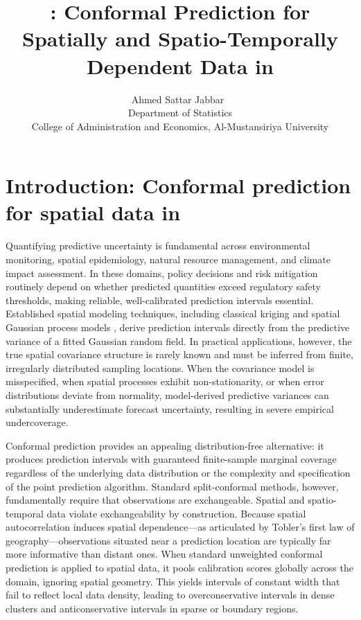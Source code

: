 \documentclass[article]{jss}
\author{Ahmed Sattar Jabbar~\orcidlink{0009-0006-4614-735X}\\Department of Statistics\\College of Administration and Economics, Al-Mustansiriya University}
\title{\pkg{spconform}: Conformal Prediction for Spatially and Spatio-Temporally Dependent Data in \proglang{R}}
\begin{document}



\section[Introduction: Conformal prediction for spatial data in R]{Introduction: Conformal prediction for spatial data in }\label{sec:intro}

Quantifying predictive uncertainty is fundamental across environmental monitoring, spatial epidemiology, natural resource management, and climate impact assessment. In these domains, policy decisions and risk mitigation routinely depend on whether predicted quantities exceed regulatory safety thresholds, making reliable, well-calibrated prediction intervals essential. Established spatial modeling techniques, including classical kriging \citep{Cressie:1993} and spatial Gaussian process models \citep[e.g.,][]{Zammit-Mangion+Cressie:2017}, derive prediction intervals directly from the predictive variance of a fitted Gaussian random field. In practical applications, however, the true spatial covariance structure is rarely known and must be inferred from finite, irregularly distributed sampling locations. When the covariance model is misspecified, when spatial processes exhibit non-stationarity, or when error distributions deviate from normality, model-derived predictive variances can substantially underestimate forecast uncertainty, resulting in severe empirical undercoverage.

Conformal prediction \citep{Vovk+Gammerman+Shafer:2005, Lei+al:2018} provides an appealing distribution-free alternative: it produces prediction intervals with guaranteed finite-sample marginal coverage regardless of the underlying data distribution or the complexity and specification of the point prediction algorithm. Standard split-conformal methods, however, fundamentally require that observations are exchangeable. Spatial and spatio-temporal data violate exchangeability by construction. Because spatial autocorrelation induces spatial dependence---as articulated by Tobler's first law of geography---observations situated near a prediction location are typically far more informative than distant ones. When standard unweighted conformal prediction is applied to spatial data, it pools calibration scores globally across the domain, ignoring spatial geometry. This yields intervals of constant width that fail to reflect local data density, leading to overconservative intervals in dense clusters and anticonservative intervals in sparse or boundary regions.
\end{document}

